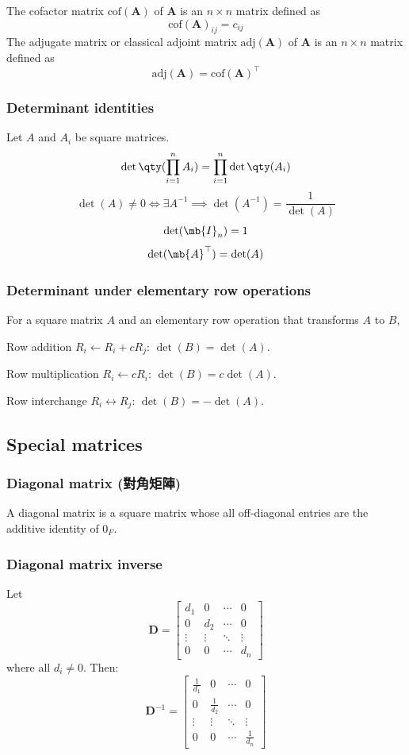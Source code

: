 \documentclass[a4paper,12pt]{report}
\begin{document}
The cofactor matrix $\mathrm{cof}(\mathbf{A})$ of $\mathbf{A}$ is an $n\times n$ matrix defined as
\[\mathrm{cof}(\mathbf{A})_{ij}=c_{ij}\]
The adjugate matrix or classical adjoint matrix $\mathrm{adj}(\mathbf{A})$ of $\mathbf{A}$ is an $n\times n$ matrix defined as
\[\mathrm{adj}(\mathbf{A})=\mathrm{cof}(\mathbf{A})^\top\]
\subsubsection{Determinant identities}
Let $A$ and $A_i$ be square matrices.
\[\det\qty(\prod_{i=1}^nA_i)=\prod_{i=1}^n\det\qty(A_i)\]
\[\det(A)\neq 0\iff\exists A^{-1}\implies\det(A^{-1})=\frac{1}{\det(A)}\]
\[\det(\mb{I}_n)=1\]
\[\det(\mb{A}^\top)=\det(A)\]
\subsubsection{Determinant under elementary row operations}
For a square matrix $A$ and an elementary row operation that transforms $A$ to $B$,
\bit
\item Row addition $R_i\leftarrow R_i+cR_j$: $\det(B)=\det(A)$.
\item Row multiplication $R_i\leftarrow cR_i$: $\det(B)=c\det(A)$.
\item Row interchange $R_i\leftrightarrow R_j$: $\det(B)=-\det(A)$.
\eit
\subsection{Special matrices}
\subsubsection{Diagonal matrix (對角矩陣)}
A diagonal matrix is a square matrix whose all off-diagonal entries are the additive identity of $0_{F}$.
\subsubsection{Diagonal matrix inverse}
Let
\[\mathbf{D} = \begin{bmatrix}
d_1 & 0 & \cdots & 0 \\
0 & d_2 & \cdots & 0 \\
\vdots & \vdots & \ddots & \vdots \\
0 & 0 & \cdots & d_n
\end{bmatrix}\]
where all $d_i\neq 0$. Then:
\[\mathbf{D}^{-1} = \begin{bmatrix}
\frac{1}{d_1} & 0 & \cdots & 0 \\
0 & \frac{1}{d_2} & \cdots & 0 \\
\vdots & \vdots & \ddots & \vdots \\
0 & 0 & \cdots & \frac{1}{d_n}\end{bmatrix}\]
\end{document}

